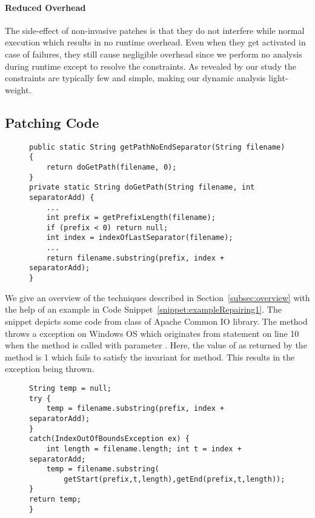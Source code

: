 \paragraph{Reduced Overhead} The side-effect of non-invasive patches is that they do not interfere while
normal execution which results in no runtime overhead. Even when they get activated in case of failures,
they still cause negligible overhead since we perform no analysis during runtime except to resolve the constraints.
As revealed by our study the constraints are typically few and simple, making our dynamic analysis light-weight.


\subsection{Patching Code}
\label{subsec:patchingexample}
	

\begin{figure}[t]
\begin{lstlisting}
public static String getPathNoEndSeparator(String filename) {
	return doGetPath(filename, 0);
}
private static String doGetPath(String filename, int separatorAdd) {
	...
	int prefix = getPrefixLength(filename);
	if (prefix < 0) return null;
	int index = indexOfLastSeparator(filename);
	...
	return filename.substring(prefix, index + separatorAdd);
}
\end{lstlisting}
\end{figure}

We give an overview of the techniques described in Section~\ref{subsec:overview} with the help of
an example in Code Snippet~\ref{snippet:exampleRepairing1}. The snippet depicts some code
from  class of Apache Common IO library. The method  throws
a  exception on Windows OS which originates from statement 
 on
line 10 when the method is called with parameter .  Here, the value of  as
returned by the method  is 1 which fails to satisfy the invariant
 for  method. This results in the exception being thrown.


\begin{figure}[t]
\begin{lstlisting}
String temp = null;
try {
	temp = filename.substring(prefix, index + separatorAdd);
}
catch(IndexOutOfBoundsException ex) {
	int length = filename.length; int t = index + separatorAdd;
	temp = filename.substring(
		getStart(prefix,t,length),getEnd(prefix,t,length));
}
return temp;
}
\end{lstlisting}
\end{figure}


